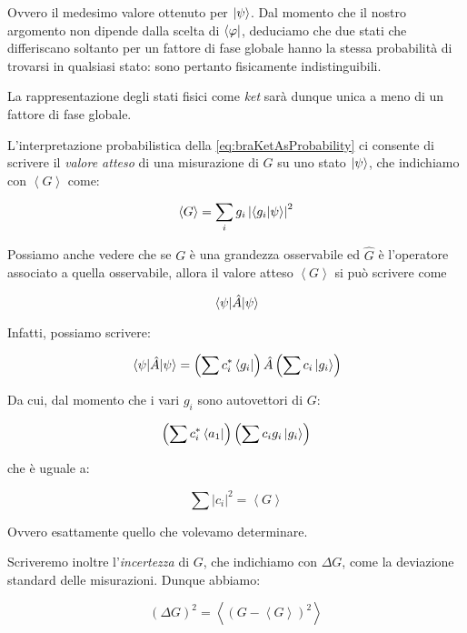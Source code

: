 Ovvero il medesimo valore ottenuto per $\ket{\psi}$. Dal momento che il nostro argomento non dipende dalla scelta di $\bra{\varphi}$, deduciamo che due stati che differiscano soltanto per un fattore di fase globale hanno la stessa probabilit\`a di trovarsi in qualsiasi stato: sono pertanto fisicamente indistinguibili.

La rappresentazione degli stati fisici come \textit{ket} sar\`a dunque unica a meno di un fattore di fase globale.

L'interpretazione probabilistica della \eqref{eq:braKetAsProbability} ci consente di scrivere il \textit{valore atteso} di una misurazione di $G$ su uno stato $\ket{\psi}$, che indichiamo con $\left \langle G \right \rangle$ come:

	\begin{equation}
		\left \langle G \right \rangle = \sum_i g_i \left | \braket{g_i}{\psi} \right |^2
	\end{equation}

Possiamo anche vedere che se $G$ \`e una grandezza osservabile ed $\hat{G}$ \`e l'operatore associato a quella osservabile, allora il valore atteso $\left \langle G \right \rangle$ si può scrivere come

	\[
		\mel{\psi}{\hat{A}}{\psi}
	\]

Infatti, possiamo scrivere:

	\begin{equation}
		\mel{\psi}{\hat{A}}{\psi} = \left ( \sum c_i^* \bra{g_i} \right ) \hat{A} \left ( \sum c_i \ket{g_i} \right )
	\end{equation}

Da cui, dal momento che i vari $g_i$ sono autovettori di $G$:

	\begin{equation}
		\left ( \sum c_i^* \bra{a_1} \right ) \left ( \sum c_i g_i \ket{g_i} \right )
	\end{equation}

che \`e uguale a:

	\begin{equation}
		\sum \left | c_i \right | ^2 = \left \langle G \right \rangle
	\end{equation}

Ovvero esattamente quello che volevamo determinare.

Scriveremo inoltre l'\textit{incertezza} di $G$, che indichiamo con $\Delta G$, come la deviazione standard delle misurazioni. Dunque abbiamo:

	\begin{equation}
		(\Delta G)^2 = \left \langle (G - \left \langle G \right \rangle) ^2 \right \rangle
	\end{equation}

